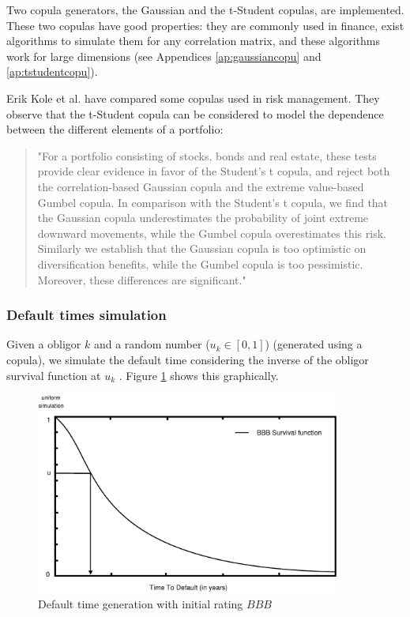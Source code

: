 \documentclass[a4paper,12pt,final]{article}
\begin{document}
Two copula generators, the Gaussian and the t-Student copulas, are implemented. 
These two copulas have good properties: they are commonly used in finance, exist 
algorithms to simulate them for any correlation matrix, and these algorithms work 
for large dimensions (see Appendices \ref{ap:gaussiancopu} and \ref{ap:tstudentcopu}).
\newline

Erik Kole et al. \cite{copu:selecting} have compared some copulas used in risk 
management. They observe that the t-Student copula can be considered to model the 
dependence between the different elements of a portfolio:
\begin{quotation}
"For a portfolio consisting of stocks, bonds and real estate, these tests provide
clear evidence in favor of the Student's t copula, and reject both the correlation-based
Gaussian copula and the extreme value-based Gumbel copula. In comparison with the
Student's t copula, we find that the Gaussian copula underestimates the probability of
joint extreme downward movements, while the Gumbel copula overestimates this risk.
Similarly we establish that the Gaussian copula is too optimistic on diversiﬁcation
benefits, while the Gumbel copula is too pessimistic. Moreover, these differences are
significant."
\end{quotation}

\subsubsection{Default times simulation}
\label{sec:deftimessim}
Given a obligor $k$ and a random number ($u_k \in [0,1]$) (generated using a 
copula), we simulate the default time considering the inverse of the obligor 
survival function at $u_k$ \cite{ref:cred_risk}. 
Figure \ref{simttd} shows this graphically.

\begin{figure}[!hbt]
\begin{center}
\includegraphics[width=10cm,angle=0]{./images/simttd.eps}
\caption{Default time generation with initial rating $BBB$}
\label{simttd}
\end{center}
\end{figure}
\FloatBarrier
\end{document}
